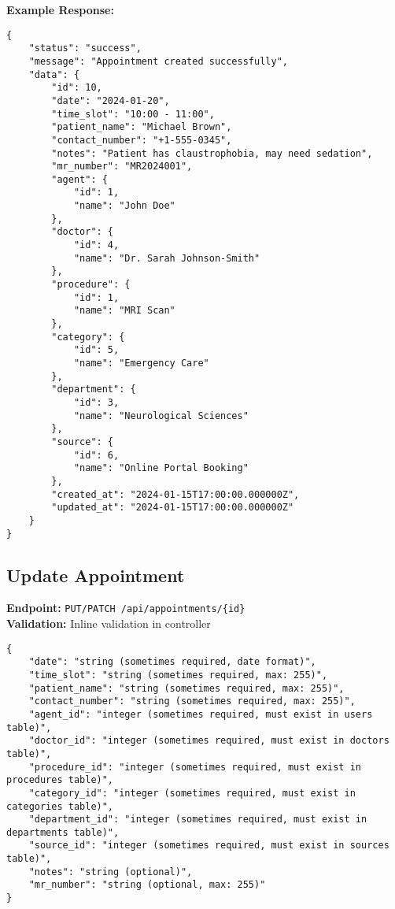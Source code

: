\documentclass[12pt,a4paper]{article}
\begin{document}
\textbf{Example Response:}
\begin{lstlisting}[caption=Create Appointment Example Response]
{
    "status": "success",
    "message": "Appointment created successfully",
    "data": {
        "id": 10,
        "date": "2024-01-20",
        "time_slot": "10:00 - 11:00",
        "patient_name": "Michael Brown",
        "contact_number": "+1-555-0345",
        "notes": "Patient has claustrophobia, may need sedation",
        "mr_number": "MR2024001",
        "agent": {
            "id": 1,
            "name": "John Doe"
        },
        "doctor": {
            "id": 4,
            "name": "Dr. Sarah Johnson-Smith"
        },
        "procedure": {
            "id": 1,
            "name": "MRI Scan"
        },
        "category": {
            "id": 5,
            "name": "Emergency Care"
        },
        "department": {
            "id": 3,
            "name": "Neurological Sciences"
        },
        "source": {
            "id": 6,
            "name": "Online Portal Booking"
        },
        "created_at": "2024-01-15T17:00:00.000000Z",
        "updated_at": "2024-01-15T17:00:00.000000Z"
    }
}
\end{lstlisting}

\subsection{Update Appointment}
\textbf{Endpoint:} \texttt{PUT/PATCH /api/appointments/\{id\}}\\
\textbf{Validation:} Inline validation in controller

\begin{lstlisting}[caption=Update Appointment Request Body]
{
    "date": "string (sometimes required, date format)",
    "time_slot": "string (sometimes required, max: 255)",
    "patient_name": "string (sometimes required, max: 255)",
    "contact_number": "string (sometimes required, max: 255)",
    "agent_id": "integer (sometimes required, must exist in users table)",
    "doctor_id": "integer (sometimes required, must exist in doctors table)",
    "procedure_id": "integer (sometimes required, must exist in procedures table)",
    "category_id": "integer (sometimes required, must exist in categories table)",
    "department_id": "integer (sometimes required, must exist in departments table)",
    "source_id": "integer (sometimes required, must exist in sources table)",
    "notes": "string (optional)",
    "mr_number": "string (optional, max: 255)"
}
\end{lstlisting}
\end{document}
